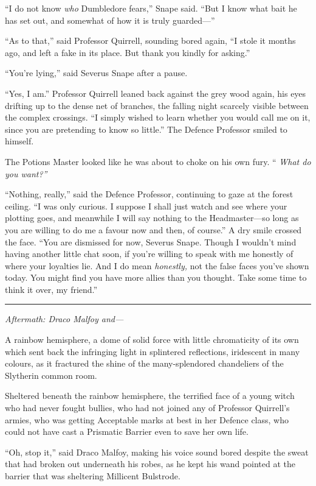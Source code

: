 ``I do not know \emph{who} Dumbledore fears,'' Snape said. ``But I know
what bait he has set out, and somewhat of how it is truly guarded---''

``As to that,'' said Professor Quirrell, sounding bored again, ``I stole
it months ago, and left a fake in its place. But thank you kindly for
asking.''

``You're lying,'' said Severus Snape after a pause.

``Yes, I am.'' Professor Quirrell leaned back against the grey wood
again, his eyes drifting up to the dense net of branches, the falling
night scarcely visible between the complex crossings. ``I simply wished
to learn whether you would call me on it, since you are pretending to
know so little.'' The Defence Professor smiled to himself.

The Potions Master looked like he was about to choke on his own fury. ``
\emph{What do you want?''}

``Nothing, really,'' said the Defence Professor, continuing to gaze at
the forest ceiling. ``I was only curious. I suppose I shall just watch
and see where your plotting goes, and meanwhile I will say nothing to
the Headmaster---so long as you are willing to do me a favour now and
then, of course.'' A dry smile crossed the face. ``You are dismissed for
now, Severus Snape. Though I wouldn't mind having another little chat
soon, if you're willing to speak with me honestly of where your
loyalties lie. And I do mean \emph{honestly,} not the false faces you've
shown today. You might find you have more allies than you thought. Take
some time to think it over, my friend.''

\begin{center}\rule{3in}{0.4pt}\end{center}

\emph{Aftermath: Draco Malfoy and---}

A rainbow hemisphere, a dome of solid force with little chromaticity of
its own which sent back the infringing light in splintered reflections,
iridescent in many colours, as it fractured the shine of the
many-splendored chandeliers of the Slytherin common room.

Sheltered beneath the rainbow hemisphere, the terrified face of a young
witch who had never fought bullies, who had not joined any of Professor
Quirrell's armies, who was getting Acceptable marks at best in her
Defence class, who could not have cast a Prismatic Barrier even to save
her own life.

``Oh, stop it,'' said Draco Malfoy, making his voice sound bored despite
the sweat that had broken out underneath his robes, as he kept his wand
pointed at the barrier that was sheltering Millicent Bulstrode.

